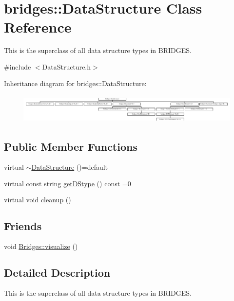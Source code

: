 \hypertarget{classbridges_1_1_data_structure}{}\section{bridges\+:\+:Data\+Structure Class Reference}
\label{classbridges_1_1_data_structure}


This is the superclass of all data structure types in B\+R\+I\+D\+G\+ES.  




{\ttfamily \#include $<$Data\+Structure.\+h$>$}

Inheritance diagram for bridges\+:\+:Data\+Structure\+:\begin{figure}[H]
\begin{center}
\leavevmode
\includegraphics[height=1.544402cm]{classbridges_1_1_data_structure}
\end{center}
\end{figure}
\subsection*{Public Member Functions}
\begin{DoxyCompactItemize}
\item 
virtual \hyperlink{classbridges_1_1_data_structure_afd70a1ae5c2578d80a441714f95f9401}{$\sim$\+Data\+Structure} ()=default
\item 
virtual const string \hyperlink{classbridges_1_1_data_structure_a957a63b106e340bc753620c650632bdc}{get\+D\+Stype} () const =0
\item 
virtual void \hyperlink{classbridges_1_1_data_structure_ac3ad75810fd77f0ad35b9b5123d2c8f8}{cleanup} ()
\end{DoxyCompactItemize}
\subsection*{Friends}
\begin{DoxyCompactItemize}
\item 
void \hyperlink{classbridges_1_1_data_structure_a0a9e3be9faab475909293766dcda4779}{Bridges\+::visualize} ()
\end{DoxyCompactItemize}


\subsection{Detailed Description}
This is the superclass of all data structure types in B\+R\+I\+D\+G\+ES. 

